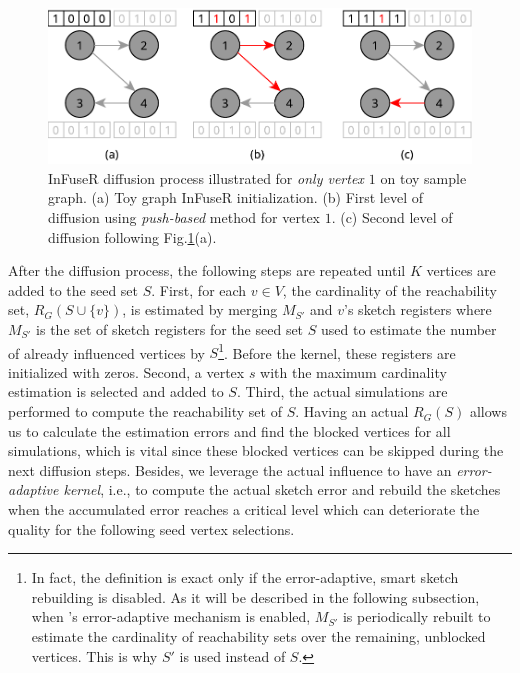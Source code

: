 \documentclass[final,5p,times,twocolumn]{elsarticle}
\newcommand\acro{{\sc{HyperFuseR\xspace}\xspace}\xspace}
\begin{document}
\begin{figure}[!ht]
    \begin{center}
    \includegraphics[width=0.85\linewidth]{images/infuserdiff.pdf}
    \caption{{\sc InFuseR} diffusion process illustrated for \emph{only vertex $1$} on toy sample graph.  (a) \label{fig:infuserinit} Toy graph InFuseR initialization.  (b) \label{infuserdiff1} First level of diffusion using \emph{push-based} method for vertex $1$. (c) Second level of diffusion following Fig.\ref{fig:infuserdiff}(a).
     }\label{fig:infuserdiff} 
    \end{center}
\end{figure}

After the diffusion process, the following steps are repeated until $K$ vertices are added to the seed set $S$. First, for each $v \in V$, the cardinality of the reachability set, $R_G(S \cup \{v\})$, is estimated by merging $M_{S'}$ and $v$'s sketch registers where $M_{S'}$ is the set of sketch registers for the seed set $S$ used to estimate the number of already influenced vertices by $S$\footnote{In fact, the definition is exact only if the error-adaptive, smart sketch rebuilding is disabled. As it will be described in the following subsection, when \acro's error-adaptive mechanism is enabled, $M_{S'}$ is periodically rebuilt to estimate the cardinality of reachability sets over the remaining, unblocked vertices. This is why $S'$ is used instead of $S$.}. Before the kernel, these registers are initialized with zeros. Second, a vertex $s$ with the maximum cardinality estimation is selected and added to $S$. Third, the actual simulations are performed to compute the reachability set of $S$. Having an actual $R_G(S)$ allows us to calculate the estimation errors and find the blocked vertices for all simulations, which is vital since these blocked vertices can be skipped during the next diffusion steps. Besides, we leverage the actual influence to have an {\em error-adaptive kernel}, i.e., to compute the actual sketch error and rebuild the sketches when the accumulated error reaches a critical level which can deteriorate the quality for the following seed vertex selections.
\end{document}
